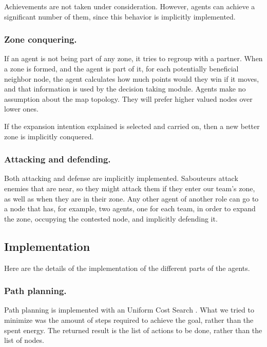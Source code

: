\documentclass{llncs2e/llncs}
\begin{document}
    Achievements are not taken under consideration. However, agents can
    achieve a significant number of them, since this behavior is implicitly 
    implemented.
    
\subsubsection{Zone conquering.}
    
    If an agent is not being part of any zone, it tries to regroup with a partner. 
    When a zone is formed, and the agent is part of it, for each potentially 
    beneficial neighbor node, the agent calculates how much points would they win 
    if it moves, and that information is used by the decision taking module.
    Agents make no assumption about the map topology. They will prefer higher 
    valued nodes over lower ones.

    If the expansion intention explained is selected and carried on, then a new 
    better zone is implicitly conquered.

\subsubsection{Attacking and defending.}
    
    Both attacking and defense are implicitly implemented. Sabouteurs attack 
    enemies that are near, so they might attack them if they enter our team's 
    zone, as well as when they are in their zone. Any other agent of another role
    can go to a node that has, for example, two agents, one for each team, in order
    to expand the zone, occupying the contested node, and implicitly defending it.
    
\subsection{Implementation}

    Here are the details of the implementation of the different parts of the
    agents.

\subsubsection{Path planning.}

    Path planning is implemented with an Uniform Cost Search 
    \cite{Russell:2003:AIM:773294}. 
    What we tried to minimize was the amount of steps required to achieve the 
    goal, rather than the spent energy. 
    The returned result is the list of actions to be done, rather than the list of 
    nodes.
    
\end{document}
